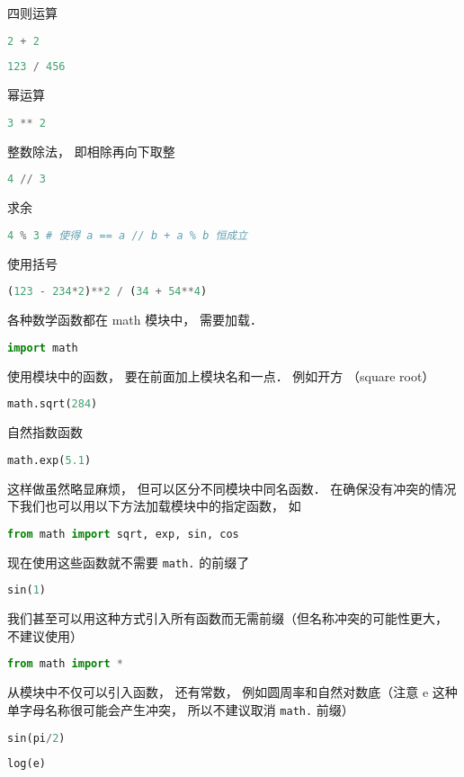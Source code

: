 四则运算
\begin{lstlisting}[language=python]
2 + 2
\end{lstlisting}
\begin{lstlisting}[language=python]
123 / 456
\end{lstlisting}
幂运算
\begin{lstlisting}[language=python]
3 ** 2
\end{lstlisting}
整数除法， 即相除再向下取整
\begin{lstlisting}[language=python]
4 // 3
\end{lstlisting}
求余
\begin{lstlisting}[language=python]
4 % 3 # 使得 a == a // b + a % b 恒成立
\end{lstlisting}
使用括号
\begin{lstlisting}[language=python]
(123 - 234*2)**2 / (34 + 54**4)
\end{lstlisting}
各种数学函数都在 math 模块中， 需要加载．
\begin{lstlisting}[language=python]
import math
\end{lstlisting}
使用模块中的函数， 要在前面加上模块名和一点． 例如开方 （square root）
\begin{lstlisting}[language=python]
math.sqrt(284)
\end{lstlisting}
自然指数函数
\begin{lstlisting}[language=python]
math.exp(5.1)
\end{lstlisting}
这样做虽然略显麻烦， 但可以区分不同模块中同名函数． 在确保没有冲突的情况下我们也可以用以下方法加载模块中的指定函数， 如
\begin{lstlisting}[language=python]
from math import sqrt, exp, sin, cos
\end{lstlisting}
现在使用这些函数就不需要 \verb|math.| 的前缀了
\begin{lstlisting}[language=python]
sin(1)
\end{lstlisting}
我们甚至可以用这种方式引入所有函数而无需前缀（但名称冲突的可能性更大， 不建议使用）
\begin{lstlisting}[language=python]
from math import *
\end{lstlisting}
从模块中不仅可以引入函数， 还有常数， 例如圆周率和自然对数底（注意 e 这种单字母名称很可能会产生冲突， 所以不建议取消 \verb|math.| 前缀）
\begin{lstlisting}[language=python]
sin(pi/2)
\end{lstlisting}
\begin{lstlisting}[language=python]
log(e)
\end{lstlisting}


